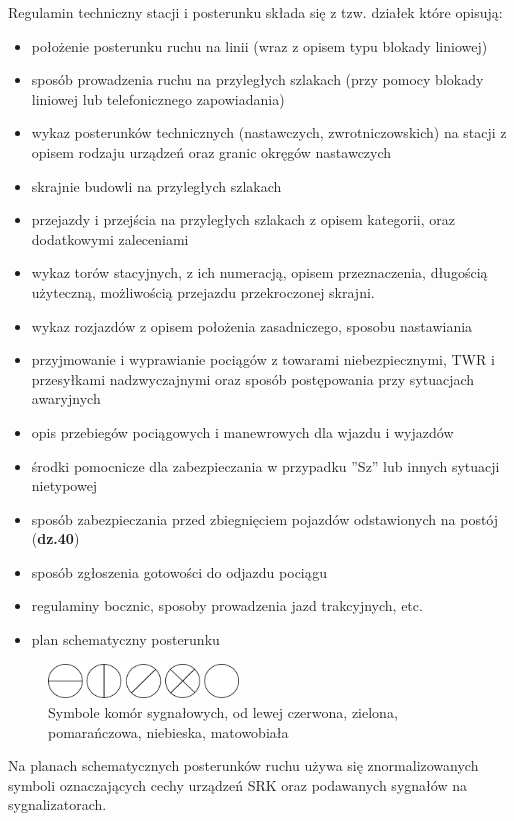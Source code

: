 Regulamin techniczny stacji i posterunku składa się z tzw. działek które opisują:
\begin{itemize}
	\item położenie posterunku ruchu na linii (wraz z opisem typu blokady liniowej)
	\item sposób prowadzenia ruchu na przyległych szlakach (przy pomocy blokady liniowej lub telefonicznego zapowiadania)
	\item wykaz posterunków technicznych (nastawczych, zwrotniczowskich) na stacji z opisem rodzaju urządzeń oraz granic okręgów nastawczych
	\item skrajnie budowli na przyległych szlakach
	\item przejazdy i przejścia na przyległych szlakach z opisem kategorii, oraz dodatkowymi zaleceniami
	\item wykaz torów stacyjnych, z ich numeracją, opisem przeznaczenia, długością użyteczną, możliwością przejazdu przekroczonej skrajni.
	\item wykaz rozjazdów z opisem położenia zasadniczego, sposobu nastawiania
	\item przyjmowanie i wyprawianie pociągów z towarami niebezpiecznymi, TWR i przesyłkami nadzwyczajnymi oraz sposób postępowania przy sytuacjach awaryjnych
	\item opis przebiegów pociągowych i manewrowych dla wjazdu i wyjazdów
	\item środki pomocnicze dla zabezpieczania w przypadku ''Sz'' lub innych sytuacji nietypowej
	\item sposób zabezpieczania przed zbiegnięciem pojazdów odstawionych na postój (\textbf{dz.40})
	\item sposób zgłoszenia gotowości do odjazdu pociągu
	\item regulaminy bocznic, sposoby prowadzenia jazd trakcyjnych, etc.
	\item plan schematyczny posterunku
\end{itemize}
	\begin{figure}
	\includegraphics[width=0.45\textwidth]{skryptkierownik-img/komory_sygnalowe_pl.png}
	\caption{Symbole komór sygnałowych, od lewej czerwona, zielona, pomarańczowa, niebieska, matowobiała}
\end{figure}

Na planach schematycznych posterunków ruchu używa się znormalizowanych symboli oznaczających cechy urządzeń SRK oraz podawanych sygnałów na sygnalizatorach.

